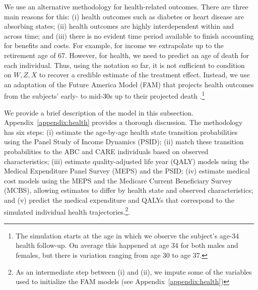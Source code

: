 We use an alternative methodology for health-related outcomes. There are three main reasons for this: (i) health outcomes such as diabetes or heart disease are absorbing states; (ii) health outcomes are highly interdependent within and across time; and (iii) there is no evident time period available to finish accounting for benefits and costs. For example, for income we extrapolate up to the retirement age of 67. However, for health, we need to predict an age of death for each individual. Thus, using the notation so far, it is not sufficient to condition on $W, Z, X$ to recover a credible estimate of the treatment effect. Instead, we use an adaptation of the Future America Model (FAM) that projects health outcomes from the subjects' early- to mid-30s up to their projected death \citep{Goldman_etal_2015_Future-Elderly-Model-Report}.\footnote{The simulation starts at the age in which we observe the subject's age-34 health follow-up. On average this happened at age 34 for both males and females, but there is variation ranging from age 30 to age 37.}

We provide a brief description of the model in this subsection. Appendix~\ref{appendix:health} provides a thorough discussion. The methodology has six steps: (i) estimate the age-by-age health state transition probabilities using the Panel Study of Income Dynamics (PSID); (ii) match these transition probabilities to the ABC and CARE individuals based on observed characteristics; (iii) estimate quality-adjusted life year (QALY) models using the Medical Expenditure Panel Survey (MEPS) and the PSID; (iv) estimate medical cost models using the MEPS and the Medicare Current Beneficiary Survey (MCBS), allowing estimates to differ by health state and observed characteristics; and (v) predict the medical expenditure and QALYs that correspond to the simulated individual health trajectories.\footnote{As an intermediate step between (i) and (ii), we impute some of the variables used to initialize the FAM models (see Appendix~\ref{appendix:health})}.

